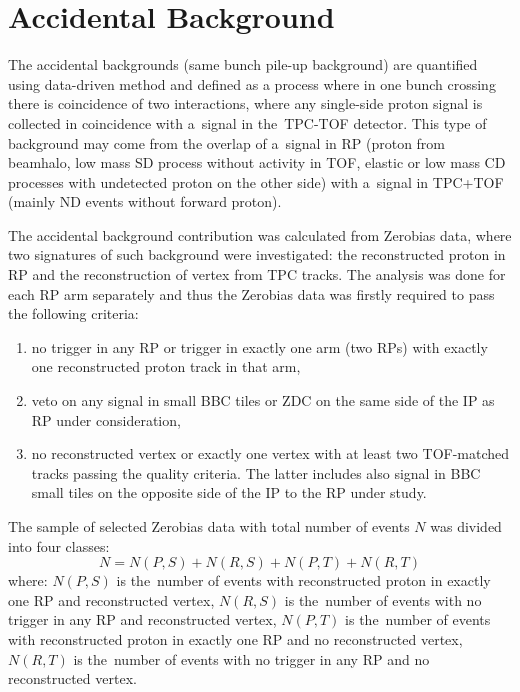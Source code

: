 \section{Accidental Background}\label{section:star_accidentals}
The accidental backgrounds (same bunch pile-up background) are quantified using data-driven method and defined as a process where in one bunch crossing there is coincidence of two interactions, where any single-side proton signal is collected in coincidence with a~signal in the~TPC-TOF detector. %
This type of background may come from the overlap of a~signal in \ac{RP} (proton from beamhalo, low mass \ac{SD} process without activity in TOF, elastic or low mass \ac{CD} processes with undetected proton on the other side) with a~signal in TPC+TOF (mainly \ac{ND} events without forward proton).

The accidental background contribution was calculated  from Zerobias data, where two signatures of such background were investigated: the reconstructed proton in RP and the reconstruction of vertex from TPC tracks. The analysis was done for each RP arm separately and thus the 
 Zerobias data was firstly required to pass the following criteria:
\begin{enumerate}
	\item no trigger in any RP or trigger in exactly one arm (two RPs) with exactly one reconstructed proton track in that arm,
	\item veto on any signal in small BBC tiles or ZDC on the same  side of the IP as  RP under consideration,
	\item no reconstructed vertex or exactly one vertex with at least two TOF-matched tracks passing the quality criteria. The latter includes also signal in BBC small tiles on the opposite side of the IP to the RP under study. 
\end{enumerate}
 The sample of selected Zerobias data with total  number  of events $N$ was divided into four classes:
\begin{equation}
N=N(P,S)+N(R,S)+N(P,T)+N(R,T)
\label{eq:accidentalSTAR_N}
\end{equation}
where: $N(P,S)$ is the~number of events with reconstructed proton in exactly one RP and reconstructed vertex, $N(R,S)$  is the~number of events with no trigger in any RP and reconstructed vertex, $N(P,T)$ is the~number of events with reconstructed proton in exactly one RP and no reconstructed vertex, $N(R,T)$ is the~number of events with no trigger in any RP and no reconstructed vertex.\\

